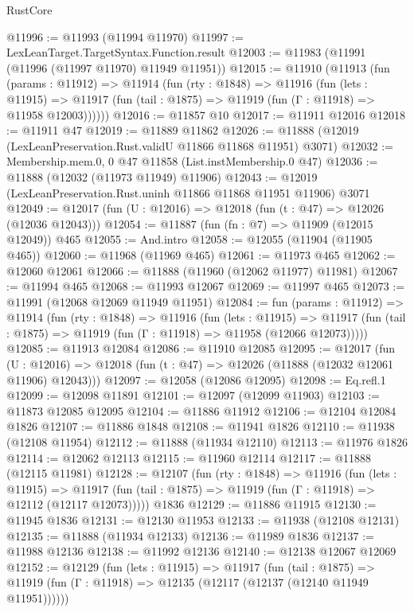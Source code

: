 \begin{lexlean}{RustCore}
\begin{coremodule}
@11996 := @11993 (@11994 @11970)
@11997 := LexLeanTarget.TargetSyntax.Function.result
@12003 := @11983 (@11991 (@11996 (@11997 @11970) @11949 @11951))
@12015 := @11910
    (@11913
      (fun (params : @11912) =>
      @11914
        (fun (rty : @1848) =>
        @11916
          (fun (lets : @11915) =>
          @11917 (fun (tail : @1875) => @11919 (fun (Γ : @11918) => @11958 @12003))))))
@12016 := @11857 @10
@12017 := @11911 @12016
@12018 := @11911 @47
@12019 := @11889 @11862
@12026 := @11888 (@12019 (LexLeanPreservation.Rust.validU @11866 @11868 @11951) @3071)
@12032 := Membership.mem.{0, 0} @47 @11858 (List.instMembership.{0} @47)
@12036 := @11888 (@12032 (@11973 @11949) @11906)
@12043 := @12019 (LexLeanPreservation.Rust.uninh @11866 @11868 @11951 @11906) @3071
@12049 := @12017 (fun (U : @12016) => @12018 (fun (t : @47) => @12026 (@12036 @12043)))
@12054 := @11887 (fun (fn : @7) => @11909 (@12015 @12049)) @465
@12055 := And.intro
@12058 := @12055 (@11904 (@11905 @465))
@12060 := @11968 (@11969 @465)
@12061 := @11973 @465
@12062 := @12060 @12061
@12066 := @11888 (@11960 (@12062 @11977) @11981)
@12067 := @11994 @465
@12068 := @11993 @12067
@12069 := @11997 @465
@12073 := @11991 (@12068 @12069 @11949 @11951)
@12084 := fun (params : @11912) =>
  @11914
    (fun (rty : @1848) =>
    @11916
      (fun (lets : @11915) =>
      @11917 (fun (tail : @1875) => @11919 (fun (Γ : @11918) => @11958 (@12066 @12073)))))
@12085 := @11913 @12084
@12086 := @11910 @12085
@12095 := @12017
    (fun (U : @12016) => @12018 (fun (t : @47) => @12026 (@11888 (@12032 @12061 @11906) @12043)))
@12097 := @12058 (@12086 @12095)
@12098 := Eq.refl.{1}
@12099 := @12098 @11891
@12101 := @12097 (@12099 @11903)
@12103 := @11873 @12085 @12095
@12104 := @11886 @11912
@12106 := @12104 @12084 @1826
@12107 := @11886 @1848
@12108 := @11941 @1826
@12110 := @11938 (@12108 @11954)
@12112 := @11888 (@11934 @12110)
@12113 := @11976 @1826
@12114 := @12062 @12113
@12115 := @11960 @12114
@12117 := @11888 (@12115 @11981)
@12128 := @12107
    (fun (rty : @1848) =>
    @11916
      (fun (lets : @11915) =>
      @11917 (fun (tail : @1875) => @11919 (fun (Γ : @11918) => @12112 (@12117 @12073)))))
    @1836
@12129 := @11886 @11915
@12130 := @11945 @1836
@12131 := @12130 @11953
@12133 := @11938 (@12108 @12131)
@12135 := @11888 (@11934 @12133)
@12136 := @11989 @1836
@12137 := @11988 @12136
@12138 := @11992 @12136
@12140 := @12138 @12067 @12069
@12152 := @12129
    (fun (lets : @11915) =>
    @11917
      (fun (tail : @1875) =>
      @11919 (fun (Γ : @11918) => @12135 (@12117 (@12137 (@12140 @11949 @11951))))))

\end{coremodule}
\end{lexlean}
